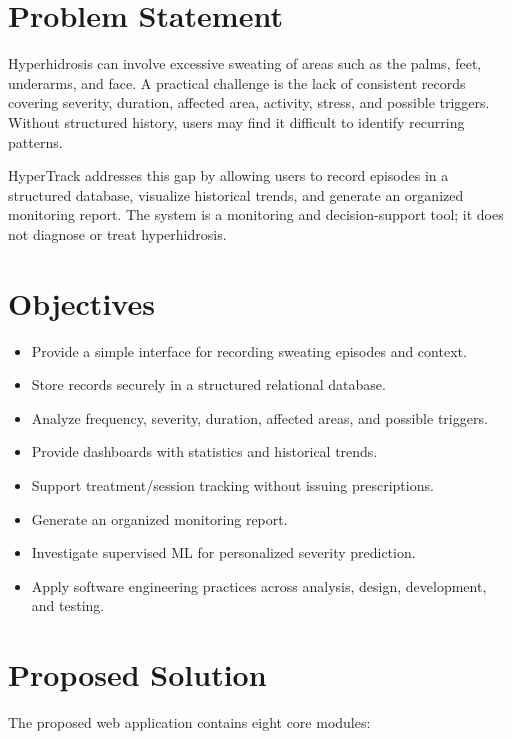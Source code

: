 \documentclass[11pt,a4paper]{article}
\begin{document}
\section{Problem Statement}

Hyperhidrosis can involve excessive sweating of areas such as the palms, feet, underarms, and face. A practical challenge is the lack of consistent records covering severity, duration, affected area, activity, stress, and possible triggers. Without structured history, users may find it difficult to identify recurring patterns.

HyperTrack addresses this gap by allowing users to record episodes in a structured database, visualize historical trends, and generate an organized monitoring report. The system is a monitoring and decision-support tool; it does not diagnose or treat hyperhidrosis.


\section{Objectives}

\begin{itemize}
\item Provide a simple interface for recording sweating episodes and context.
\item Store records securely in a structured relational database.
\item Analyze frequency, severity, duration, affected areas, and possible triggers.
\item Provide dashboards with statistics and historical trends.
\item Support treatment/session tracking without issuing prescriptions.
\item Generate an organized monitoring report.
\item Investigate supervised ML for personalized severity prediction.
\item Apply software engineering practices across analysis, design, development, and testing.
\end{itemize}


\section{Proposed Solution}

The proposed web application contains eight core modules:
\end{document}

